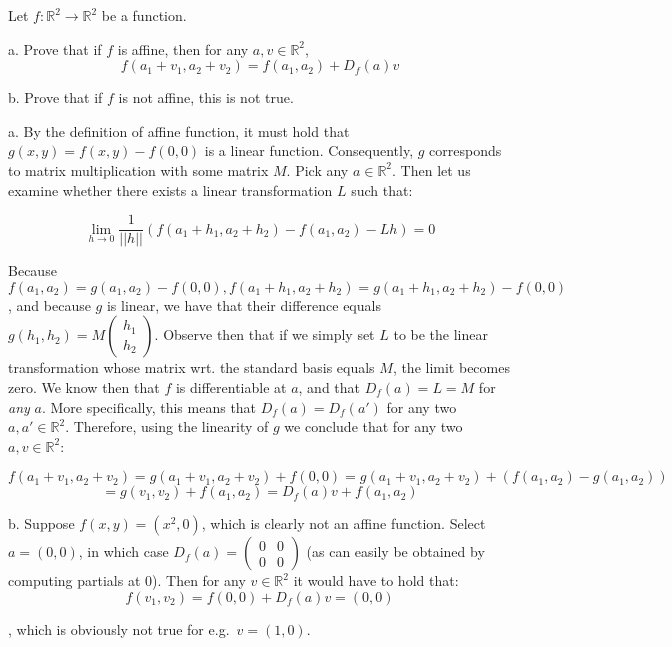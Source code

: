 \begin{exercise}{10}
    Let $f: \mathbb{R}^2 \rightarrow \mathbb{R}^2$ be a function.

    a. Prove that if $f$ is affine, then for any $a, v \in \mathbb{R}^2$,
    $$f(a_1 + v_1, a_2 + v_2) = f(a_1, a_2) + D_f(a) v$$

    b. Prove that if $f$ is not affine, this is not true.
\end{exercise}

\begin{solution}

    a. By the definition of affine function, it must hold that $g(x, y) = f(x, y) - f(0, 0)$ is a linear function. Consequently, $g$ corresponds to matrix multiplication with some matrix $M$. Pick any $a \in \mathbb{R}^2$. Then let us examine whether there exists a linear transformation $L$ such that:

    $$\lim_{h \rightarrow 0} \frac{1}{\lvert \lvert h \rvert \rvert}(f(a_1 + h_1, a_2 + h_2) - f(a_1, a_2) - L h) = 0$$

    Because $f(a_1, a_2) = g(a_1, a_2) - f(0, 0), f(a_1 + h_1, a_2 + h_2) = g(a_1 + h_1, a_2 + h_2) - f(0, 0)$, and because $g$ is linear, we have that their difference equals $g(h_1, h_2) = M\begin{pmatrix}
        h_1 \\ h_2
    \end{pmatrix}$. Observe then that if we simply set $L$ to be the linear transformation whose matrix wrt. the standard basis equals $M$, the limit becomes zero. We know then that $f$ is differentiable at $a$, and that $D_f(a) = L = M$ for \textit{any} $a$. More specifically, this means that $D_f(a) = D_f(a')$ for any two $a, a' \in \mathbb{R}^2$. Therefore, using the linearity of $g$ we conclude that for any two $a, v \in \mathbb{R}^2$:

    $$f(a_1 + v_1, a_2 + v_2) = g(a_1 + v_1, a_2 + v_2) + f(0, 0) = g(a_1 + v_1, a_2 + v_2) + (f(a_1, a_2) - g(a_1, a_2))$$
    $$ = g(v_1, v_2) + f(a_1, a_2) = D_f(a)v + f(a_1, a_2)$$

    b. Suppose $f(x, y) = (x^2, 0)$, which is clearly not an affine function. Select $a = (0, 0)$, in which case $D_f(a) = \begin{pmatrix}
        0 & 0 \\ 0 & 0
    \end{pmatrix}$ (as can easily be obtained by computing partials at 0). Then for any $v \in \mathbb{R}^2$ it would have to hold that:
    $$f(v_1, v_2) = f(0, 0) + D_f(a) v = (0, 0)$$

    , which is obviously not true for e.g.\ $v = (1, 0)$.
\end{solution}


